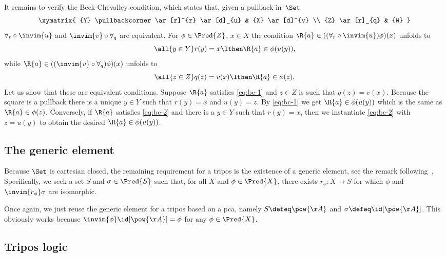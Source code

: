 It remains to verify the Beck-Chevalley condition, which states that, given a pullback in~$\Set$
%
\begin{equation*}
  \xymatrix{
    {Y} \pullbackcorner
    \ar[r]^{r} \ar[d]_{u} 
    &
    {X} \ar[d]^{v}
    \\
    {Z} \ar[r]_{q}
    &
    {W}
  }
\end{equation*}
%
$\forall_r \circ \invim{u}$ and $\invim{v} \circ \forall_q$ are equivalent.
%
For $\phi \in \Pred{Z}$, $x \in X$
the condition $\R{a} \in ((\forall_r \circ \invim{u}) \phi)(x)$ unfolds to
%
\begin{equation}
  \label{eq:bc-1}%
  \all{y \in Y} r(y) = x \lthen \R{a} \in \phi(u(y)),
\end{equation}
%
while $\R{a} \in ((\invim{v} \circ \forall_q) \phi)(x)$ unfolds to
%
\begin{equation}
  \label{eq:bc-2}%
  \all{z \in Z} q(z) = v(x) \lthen \R{a} \in \phi(z).
\end{equation}
%
Let us show that these are equivalent conditions. Suppose $\R{a}$ satisfies \eqref{eq:bc-1} and $z \in Z$ is such that $q(z) = v(x)$. Because the square is a pullback there is a unique $y \in Y$ such that $r(y) = x$ and $u(y) = z$. By \eqref{eq:bc-1} we get $\R{a} \in \phi(u(y))$ which is the same as $\R{a} \in \phi(z)$.
%
Conversely, if $\R{a}$ satisfies \eqref{eq:bc-2} and there is a $y \in Y$ such that $r(y) = x$, then we instantiate \eqref{eq:bc-2} with $z = u(y)$ to obtain the desired $\R{a} \in \phi(u(y))$.

\subsection{The generic element}
\label{sec:generic-element}

Because $\Set$ is cartesian closed, the remaining requirement for a tripos is the existence of a generic element, see the remark following~\cite[Definition~2.12]{oosten08:_realiz}. Specifically, we seek a set $S$ and $\sigma \in \Pred{S}$ such that, for all $X$ and $\phi \in \Pred{X}$, there exists $r_\phi : X \to S$ for which $\phi$ and $\invim{r_\phi} \sigma$ are isomorphic.

Once again, we just reuse the generic element for a tripos based on a pca, namely $S \defeq \pow{\AA}$ and $\sigma \defeq \id[\pow{\AA}]$. This obviously works because $\invim{\phi} \id[\pow{\AA}] = \phi$ for any $\phi \in \Pred{X}$.

\subsection{Tripos logic}
\label{sec:tripos-logic}

